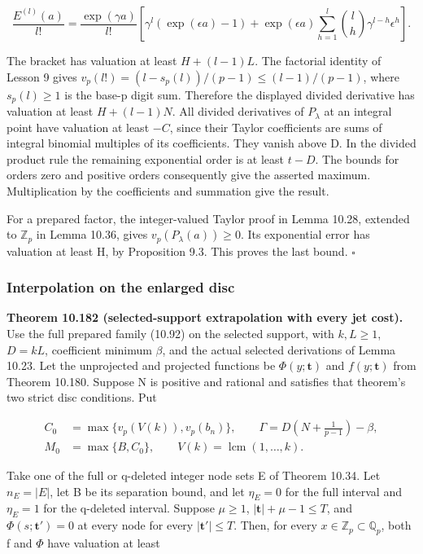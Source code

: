 \documentclass[
  11pt,
  a4paper,
]{article}
\begin{document}
\[
\frac{E^{(l)}(a)}{l!}
=\frac{\exp(\gamma a)}{l!}
 \left[\gamma^l(\exp(\epsilon a)-1)
 +\exp(\epsilon a)\sum_{h=1}^l
           \binom lh\gamma^{l-h}\epsilon^h\right].
\tag{10.688}
\]

The bracket has valuation at least \(H+(l-1)L\). The factorial identity
of Lesson 9 gives \(v_p(l!)=(l-s_p(l))/(p-1)\le(l-1)/(p-1)\), where
\(s_p(l)\ge1\) is the base-p digit sum. Therefore the displayed divided
derivative has valuation at least \(H+(l-1)N\). All divided derivatives
of \(P_\lambda\) at an integral point have valuation at least \(-C\),
since their Taylor coefficients are sums of integral binomial multiples
of its coefficients. They vanish above D. In the divided product rule
the remaining exponential order is at least \(t-D\). The bounds for
orders zero and positive orders consequently give the asserted maximum.
Multiplication by the coefficients and summation give the result.

For a prepared factor, the integer-valued Taylor proof in Lemma 10.28,
extended to \(\mathbb Z_p\) in Lemma 10.36, gives
\(v_p(P_\lambda(a))\ge0\). Its exponential error has valuation at least
H, by Proposition 9.3. This proves the last bound. \(\square\)

\subsubsection{Interpolation on the enlarged
disc}\label{interpolation-on-the-enlarged-disc}

\textbf{Theorem 10.182 (selected-support extrapolation with every jet
cost).} Use the full prepared family (10.92) on the selected support,
with \(k,L\ge1\), \(D=kL\), coefficient minimum \(\beta\), and the
actual selected derivations of Lemma 10.23. Let the unprojected and
projected functions be \(\Phi(y;\boldsymbol t)\) and
\(f(y;\boldsymbol t)\) from Theorem 10.180. Suppose N is positive and
rational and satisfies that theorem's two strict disc conditions. Put

\[
\begin{aligned}
C_0&=\max\{v_p(V(k)),v_p(b_n)\},\qquad
\Gamma=D\left(N+\frac1{p-1}\right)-\beta,\\
M_0&=\max\{B,C_0\},\qquad V(k)=\operatorname{lcm}(1,\ldots,k).
\end{aligned}
\tag{10.689}
\]

Take one of the full or q-deleted integer node sets E of Theorem 10.34.
Let \(n_E=|E|\), let B be its separation bound, and let \(\eta_E=0\) for
the full interval and \(\eta_E=1\) for the q-deleted interval. Suppose
\(\mu\ge1\), \(|\boldsymbol t|+\mu-1\le T\), and
\(\Phi(s;\boldsymbol t')=0\) at every node for every
\(|\boldsymbol t'|\le T\). Then, for every
\(x\in\mathbb Z_p\subset\mathbb Q_p\), both f and \(\Phi\) have
valuation at least
\end{document}
